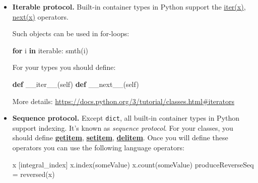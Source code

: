 \documentclass[
]{article}
\newenvironment{Shaded}{}{}
\newcommand{\BuiltInTok}[1]{#1}
\newcommand{\ControlFlowTok}[1]{\textcolor[rgb]{0.00,0.44,0.13}{\textbf{#1}}}
\newcommand{\FunctionTok}[1]{\textcolor[rgb]{0.02,0.16,0.49}{#1}}
\newcommand{\KeywordTok}[1]{\textcolor[rgb]{0.00,0.44,0.13}{\textbf{#1}}}
\newcommand{\NormalTok}[1]{#1}
\newcommand{\OperatorTok}[1]{\textcolor[rgb]{0.40,0.40,0.40}{#1}}
\newcommand{\VariableTok}[1]{\textcolor[rgb]{0.10,0.09,0.49}{#1}}
\begin{document}
\begin{itemize}
\item
  \textbf{Iterable protocol.} Built-in container types in Python support
  the
  \href{https://docs.python.org/3/library/functions.html\#iter}{iter(x)},
  \href{https://docs.python.org/3/library/functions.html\#next}{next(x)}
  operators.

  Such objects can be used in for-loops:

\begin{Shaded}
\begin{Highlighting}[]
\ControlFlowTok{for}\NormalTok{ i }\KeywordTok{in}\NormalTok{ iterable: smth(i)}
\end{Highlighting}
\end{Shaded}

  For your types you should define:

\begin{Shaded}
\begin{Highlighting}[]
\KeywordTok{def} \FunctionTok{\_\_iter\_\_}\NormalTok{(}\VariableTok{self}\NormalTok{) }
\KeywordTok{def} \FunctionTok{\_\_next\_\_}\NormalTok{(}\VariableTok{self}\NormalTok{)}
\end{Highlighting}
\end{Shaded}

  More details:
  \url{https://docs.python.org/3/tutorial/classes.html\#iterators}
\item
  \textbf{Sequence protocol.} Except \texttt{dict}, all built-in
  container types in Python support indexing. It's known as
  \emph{sequence protocol}. For your classes, you should define
  \href{https://docs.python.org/3/reference/datamodel.html?highlight=__getitem__\#object.__getitem__}{\textbf{getitem}},
  \href{https://docs.python.org/3/reference/datamodel.html\#object.__setitem__}{\textbf{setitem}},
  \href{https://docs.python.org/3/reference/datamodel.html?highlight=__getitem__\#object.__delitem__}{\textbf{delitem}}.
  Once you will define these operators you can use the following
  language operators:

\begin{Shaded}
\begin{Highlighting}[]
\NormalTok{x [integral\_index] }
\NormalTok{x.index(someValue) }
\NormalTok{x.count(someValue) }
\NormalTok{produceReverseSeq }\OperatorTok{=} \BuiltInTok{reversed}\NormalTok{(x)}
\end{Highlighting}
\end{Shaded}
\end{itemize}
\end{document}
